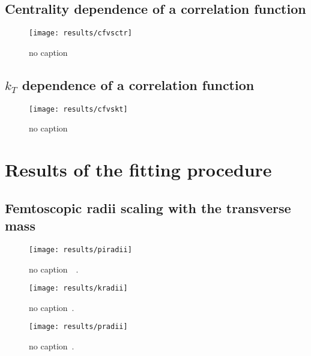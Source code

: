     \subsection{Centrality dependence of a correlation function}
      \begin{figure}[h]
        \centering
        \centerline{\texttt{[image: results/cfvsctr]}}
        \caption{no caption}
      \label{fig:centr_dep}
      \end{figure}
    \FloatBarrier
    \subsection{$k_T$ dependence of a correlation function}
      \begin{figure}[h]
        \centering
        \centerline{\texttt{[image: results/cfvskt]}}
        \caption{no caption}
      \label{fig:kt_dep}
      \end{figure}
    \FloatBarrier
  \section{Results of the fitting procedure}
    \subsection{Femtoscopic radii scaling with the transverse mass}
      \begin{figure}[h]
        \centering
        \centerline{\texttt{[image: results/piradii]}}
        \caption{no caption~\cite{alice_pion}~\cite{galazyn}.}
      \label{fig:piradii}
      \end{figure}



      \begin{figure}[h]
        \centering
        \centerline{\texttt{[image: results/kradii]}}
        \caption{no caption~\cite{galazyn}.}
      \label{fig:kradii}
      \end{figure}



      \begin{figure}[h]
        \centering
        \centerline{\texttt{[image: results/pradii]}}
        \caption{no caption~\cite{galazyn}.}
      \label{fig:pradii}
      \end{figure}    

